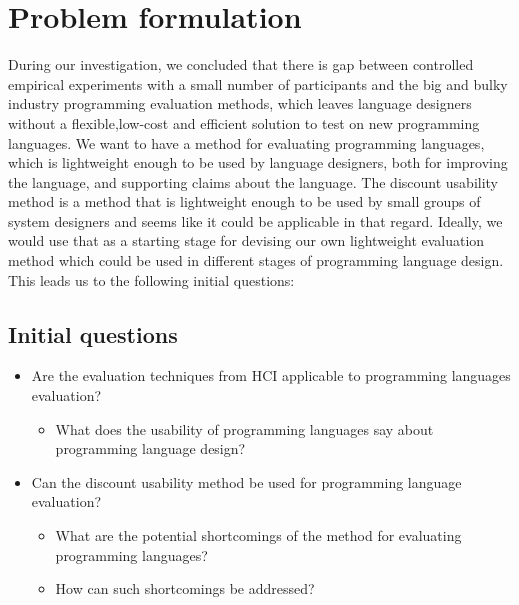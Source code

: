 \section{Problem formulation}
During our investigation, we concluded that there is gap between  controlled empirical experiments with a small number of participants and the big and bulky industry programming evaluation methods\cite{AliceCS1}\cite{BlockOrNot}\cite{FromScratch}, which leaves language designers without a flexible,low-cost and efficient solution to test on new programming languages. We want to have a method for evaluating programming languages, which is lightweight enough to be used by language designers, both for improving the language, and supporting claims about the language. The discount usability method is a method that is lightweight enough to be used by small groups of system designers and seems like it could be applicable in that regard. Ideally, we would use that as a starting stage for devising our own lightweight evaluation method which could be used in different stages of programming language design. This leads us to the following initial questions:

\subsection{Initial questions}
\begin{itemize}
\item Are the evaluation techniques from HCI applicable to programming languages evaluation?
	\begin{itemize}
		\item What does the usability of programming languages say about programming language design?
	\end{itemize}
\item Can the discount usability method be used for programming language evaluation?
	\begin{itemize}
		\item What are the potential shortcomings of the method for evaluating programming languages?
		\item How can such shortcomings be addressed?
	\end{itemize}
\end{itemize}
